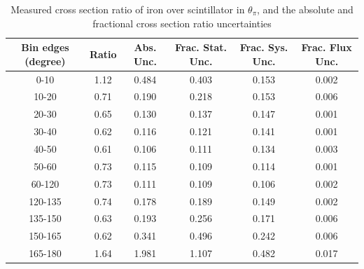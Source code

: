 \documentclass[../main.tex]{subfiles}
\begin{document}
\begin{table}
  \centering
  \renewcommand{\arraystretch}{1.15}
  \caption{Measured cross section ratio of iron over scintillator in $\theta_{\pi}$, and the absolute and fractional cross section ratio uncertainties}
    \begin{tabular}{c||c|c||c|c|c}
      Bin edges (degree) &  Ratio  &  Abs. Unc.  &  Frac. Stat. Unc.  &  Frac. Sys. Unc.  &  Frac. Flux Unc. \\
      \hline
      \hline
      0-10 & 1.12 & 0.484 & 0.403 & 0.153 & 0.002\\
      10-20 & 0.71 & 0.190 & 0.218 & 0.153 & 0.006\\
      20-30 & 0.65 & 0.130 & 0.137 & 0.147 & 0.001\\
      30-40 & 0.62 & 0.116 & 0.121 & 0.141 & 0.001\\
      40-50 & 0.61 & 0.106 & 0.111 & 0.134 & 0.003\\
      50-60 & 0.73 & 0.115 & 0.109 & 0.114 & 0.001\\
      60-120 & 0.73 & 0.111 & 0.109 & 0.106 & 0.002\\
      120-135 & 0.74 & 0.178 & 0.189 & 0.149 & 0.002\\
      135-150 & 0.63 & 0.193 & 0.256 & 0.171 & 0.006\\
      150-165 & 0.62 & 0.341 & 0.496 & 0.242 & 0.006\\
      165-180 & 1.64 & 1.981 & 1.107 & 0.482 & 0.017
    \end{tabular}
  \label{tbl:rationucleonnuc26pion_thetaa}
\end{table}
\pagebreak
\end{document}
